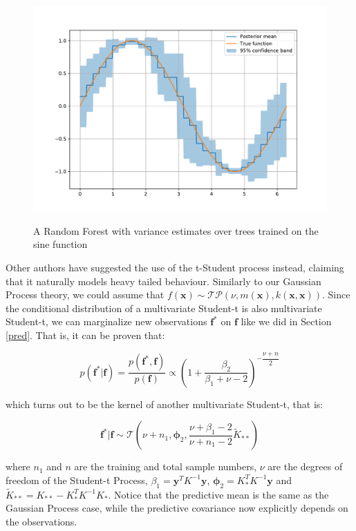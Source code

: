 \documentclass[10pt,a4paper,twoside]{book}
\begin{document}
\begin{figure}
\centering
\caption{A Random Forest with variance estimates over trees trained on the sine function}
\includegraphics[width=\textwidth]{figures/chapter3/RFsine}
\label{fig:RFsine}
\end{figure}

Other authors \cite{Shah2014} have suggested the use of the t-Student process instead, claiming that it naturally models heavy tailed behaviour. Similarly to our Gaussian Process theory, we could assume  that $f(\boldsymbol{x}) \sim \mathcal{TP}\left(\nu, m(\boldsymbol{x}), k(\boldsymbol{x}, \boldsymbol{x})\right)$. Since the conditional distribution of a multivariate Student-t is also multivariate Student-t, we can marginalize new observations $\boldsymbol{f}^*$ on $\boldsymbol{f}$ like we did in Section \ref{pred}. That is, it can be proven that:

\begin{equation}
p(\boldsymbol{f}^*|\boldsymbol{f}) = \dfrac{p(\boldsymbol{f}^*,\boldsymbol{f})}{p(\boldsymbol{f})} \propto \left( 1 + \frac{\beta_2}{\beta_1 + \nu - 2} \right)^{-\dfrac{\nu + n}{2}}
\end{equation}

which turns out to be the kernel of another multivariate Student-t, that is:

\begin{equation}
\boldsymbol{f}^*|\boldsymbol{f} \sim \mathcal{T}\left(\nu + n_1, \boldsymbol{\phi}_2, \dfrac{\nu + \beta_1 - 2}{\nu + n_1 - 2} \tilde{K}_{**} \right)
\end{equation}

where $n_1$ and $n$ are the training and total sample numbers, $\nu$ are the degrees of freedom of the Student-t Process, $\beta_1 = \boldsymbol{y}^{T}K^{-1}\boldsymbol{y}$, $\boldsymbol{\phi}_2 = K_{*}^T K^{-1}\boldsymbol{y}$ and $\tilde{K}_{**} = K_{**} - K_{*}^T K^{-1}K_{*}$. Notice that the predictive mean is the same as the Gaussian Process case, while the predictive covariance now explicitly depends on the observations.
\end{document}
